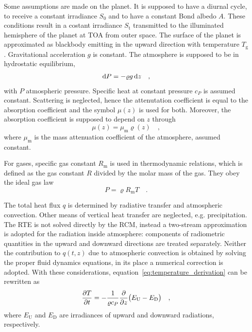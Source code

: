 \documentclass[a4paper,10pt,twocolumn,\classoptions]{article}
\begin{document}
Some assumptions are made on the planet.
It is supposed to have a diurnal cycle, to receive a constant irradiance $S_0$ and to have a constant Bond albedo $A$. These conditions result in a costant irradiance $S_\text{t}$ transmitted to the illuminated hemisphere of the planet at TOA from outer space.
The surface of the planet is approximated as blackbody emitting in the upward direction with temperature $T_\text{g}$. 
Gravitational acceleration $g$ is constant.
The atmosphere is supposed to be in hydrostatic equilibrium,
\begin{equation}
  \label{eq:hydrostatic_equilibrium}
  \odif{P} = - \varrho g \odif{z}
  \quad ,
\end{equation}
with $P$ atmospheric pressure.
Specific heat at constant pressure $c_P$ is assumed constant.
Scattering is neglected, hence the attenutation coefficient is equal to the absorption coefficient and the symbol $\mu(z)$ is used for both.
Moreover, the absorption coefficient is supposed to depend on $z$ through
\begin{equation}
  \label{eq:absorption coefficient}
  \mu(z) = \mu_\text{m} \varrho(z)
  \quad ,
\end{equation}
where $\mu_\text{m}$ is the mass attenuation coefficient of the atmosphere, assumed constant.

For gases, specific gas constant $R_\text{m}$ is used in thermodynamic relations, which is defined as the gas constant $R$ divided by the molar mass of the gas.
They obey the ideal gas law
\begin{equation}
  \label{eq:ideal_gas_law}
  P = \varrho R_\text{m} T
  \quad .
\end{equation}

The total heat flux $q$ is determined by radiative transfer and atmospheric convection. Other means of vertical heat transfer are neglected, e.g. precipitation. The RTE is not solved directly by the RCM, instead a two-stream approximation is adopted for the radiation inside atmosphere: components of radiometric quantities in the upward and downward directions are treated separately. Neither the contribution to $q(t,z)$ due to atmospheric convection is obtained by solving the proper fluid dynamics equations, in its place a numerical correction is adopted.
With these considerations, equation~\eqref{eq:temperature_derivation} can be rewritten as
\begin{equation}
  \label{eq:temperature}
  \pdv{T}{t} = -\frac{1}{\varrho c_P} \pdv*{\big( E_\text{U} - E_\text{D} \big)}{z}
  \quad ,
\end{equation}
where $E_\text{U}$ and $E_\text{D}$ are irradiances of upward and downward radiations, respectively.
\end{document}
